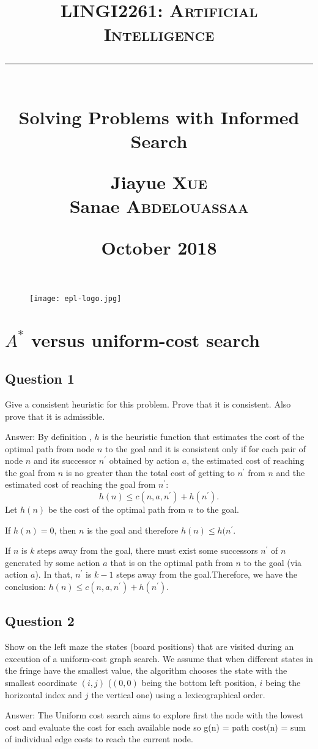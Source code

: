 \documentclass[12pt, a4paper]{report}
\title{
    \vspace{0.5cm} \textcolor{db}{\textsc{LINGI2261: Artificial Intelligence}} \\
    \vspace{0.5 cm} \rule{10 cm}{0.5pt} \\
    \vspace{0.5 cm} \Large{Solving Problems with Informed Search} \\
    \vspace{5 cm}
    \begin{flushright}
        \large
        Jiayue \textsc{Xue} \\
        Sanae \textsc{Abdelouassaa} \\     
    \end{flushright}
    \vspace{0.5 cm}
    \begin{flushright}
        \normalsize \nth{24} October 2018 \\
    \end{flushright}
}
\author{}
\date{}
\begin{document}
\begin{figure}[t]
    \hspace{10 cm} \texttt{[image: epl-logo.jpg]}
\end{figure}

\maketitle

\tableofcontents

\chapter{$A^*$ versus uniform-cost search}

\section{Question 1}
Give a consistent heuristic for this problem. Prove that 
it is consistent. Also prove that it is admissible.
\vspace{0.5 cm}
\par Answer:
By definition , $h$ is the heuristic function that estimates the cost of the optimal path from node $n$ to the goal and it is consistent only if for each pair of node $n$ and its successor $n^{'}$ obtained by action $a$, the estimated cost of reaching the goal from $n$ is no greater than the total cost of getting to $n^{'}$ from $n$ and the estimated cost of reaching the goal from $n^{'}$:
\begin{equation}
    h(n) \le c(n, a, n^{'}) + h(n^{'}).
\end{equation}
Let $h(n)$ be the cost of the optimal path from $n$ to the goal.

If $h(n)=0$, then $n$ is the goal and therefore $h(n) \le h(n^{'}$.
 
If $n$ is $k$ steps away from the goal, there must exist some successors $n^{'}$ of $n$ generated by some action $a$ that is on the optimal path from $n$ to the goal (via action $a$). In that,  $n^{'}$ is $k − 1$ steps away from the goal.Therefore, we have the conclusion: $h(n) \le c(n, a, n^{'}) + h(n^{'})$.

\section{Question 2}
Show on the left maze the states (board positions) that are visited during an execution of a uniform-cost graph search. We assume that when different states in the fringe have the smallest value, the algorithm chooses the state with the smallest coordinate $(i,j)$ ($(0,0)$ being the bottom left position, $i$ being the horizontal index and $j$ the vertical one) using a  lexicographical order.
\vspace{0.5 cm}
\par Answer:
The Uniform cost search aims to explore first the node with the lowest cost and evaluate the cost for each available node so g(n) = path cost(n) = sum of individual edge costs to reach the current node.
\end{document}
